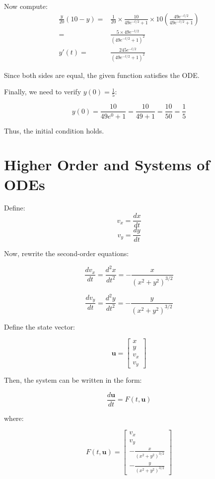 \documentclass{article}
\begin{document}
Now compute:
\begin{align*}
    \frac{y}{20} (10 - y) = & \frac{1}{20} \times \frac{10}{49e^{-t/2} + 1} \times 10 \left(\frac{49e^{-t/2}}{49e^{-t/2} + 1} \right) \\
    =                       & \frac{5 \times 49e^{-t/2}}{(49e^{-t/2} + 1)^2}                                                          \\
    y'(t)=                  & \frac{245 e^{-t/2}}{(49e^{-t/2} + 1)^2}
\end{align*}

Since both sides are equal, the given function satisfies the ODE.

Finally, we need to verify $ y(0) = \frac{1}{5} $:

$$
    y(0) = \frac{10}{49e^{0} + 1} = \frac{10}{49 + 1} = \frac{10}{50} = \frac{1}{5}
$$

Thus, the initial condition holds.

\newpage
\section{Higher Order and Systems of ODEs}
Define:
$$ v_x = \frac{dx}{dt} $$
$$ v_y = \frac{dy}{dt} $$

Now, rewrite the second-order equations:

$$
    \frac{d v_x}{dt} = \dfrac{d^2x}{dt^2} = - \frac{x}{(x^2 + y^2)^{3/2}}
$$

$$
    \frac{d v_y}{dt} = \dfrac{d^2y}{dt^2} = - \frac{y}{(x^2 + y^2)^{3/2}}
$$

Define the state vector:

$$
    \mathbf{u} = \begin{bmatrix} x \\ y \\ v_x \\ v_y \end{bmatrix}
$$

Then, the system can be written in the form:

$$
    \frac{d \mathbf{u}}{dt} = F(t, \mathbf{u})
$$

where:

$$
    F(t, \mathbf{u}) =
    \begin{bmatrix}
        v_x                           \\
        v_y                           \\
        - \frac{x}{(x^2 + y^2)^{3/2}} \\
        - \frac{y}{(x^2 + y^2)^{3/2}}
    \end{bmatrix}
$$
\end{document}
